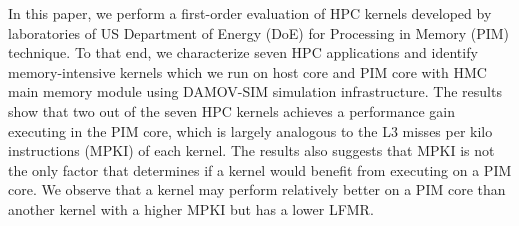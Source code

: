 In this paper, we perform a first-order evaluation of HPC kernels developed by laboratories of US Department of Energy (DoE) for Processing in Memory (PIM) technique. To that end, we characterize seven HPC applications and identify memory-intensive kernels which we run on host core and PIM core with HMC main memory module using DAMOV-SIM simulation infrastructure. The results show that two out of the seven HPC kernels achieves a performance gain executing in the PIM core, which is largely analogous to the L3 misses per kilo instructions (MPKI) of each kernel. The results also suggests that MPKI is not the only factor that determines if a kernel would benefit from executing on a PIM core. We observe that a kernel may perform relatively better on a PIM core than another kernel with a higher MPKI but has a lower LFMR. 